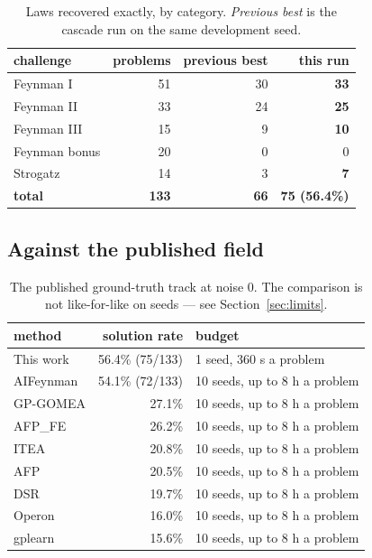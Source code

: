 \documentclass[11pt,a4paper]{article}
\begin{document}
\begin{table}[htbp]
\centering
\begin{tabular}{lrrr}
\toprule
challenge & problems & previous best & this run \\
\midrule
Feynman I      & 51  & 30 & \textbf{33} \\
Feynman II     & 33  & 24 & \textbf{25} \\
Feynman III    & 15  & 9  & \textbf{10} \\
Feynman bonus  & 20  & 0  & 0 \\
Strogatz       & 14  & 3  & \textbf{7} \\
\midrule
\textbf{total} & \textbf{133} & \textbf{66} & \textbf{75 (56.4\%)} \\
\bottomrule
\end{tabular}
\caption{Laws recovered exactly, by category. \emph{Previous best} is the
cascade run on the same development seed.}
\label{tab:results}
\end{table}

\subsection{Against the published field}

\begin{table}[htbp]
\centering
\begin{tabular}{lrl}
\toprule
method & solution rate & budget \\
\midrule
This work      & 56.4\% (75/133) & 1 seed, 360 s a problem \\
AIFeynman      & 54.1\% (72/133) & 10 seeds, up to 8 h a problem \\
GP-GOMEA       & 27.1\% & 10 seeds, up to 8 h a problem \\
AFP\_FE        & 26.2\% & 10 seeds, up to 8 h a problem \\
ITEA           & 20.8\% & 10 seeds, up to 8 h a problem \\
AFP            & 20.5\% & 10 seeds, up to 8 h a problem \\
DSR            & 19.7\% & 10 seeds, up to 8 h a problem \\
Operon         & 16.0\% & 10 seeds, up to 8 h a problem \\
gplearn        & 15.6\% & 10 seeds, up to 8 h a problem \\
\bottomrule
\end{tabular}
\caption{The published ground-truth track at noise 0. The comparison is not
like-for-like on seeds --- see Section~\ref{sec:limits}.}
\label{tab:field}
\end{table}
\end{document}
